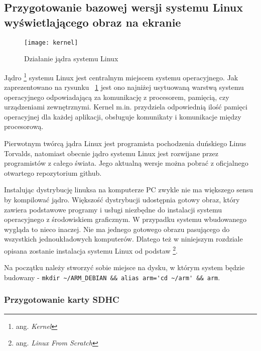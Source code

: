 \subsection{Przygotowanie bazowej wersji systemu Linux wyświetlającego obraz na ekranie}

\begin{figure}
\begin{center}
    \texttt{[image: kernel]}
\end{center}
\caption{Działanie jądra systemu Linux}
\label{fig:kernel}
\end{figure}

Jądro \footnote{ang. \emph{Kernel}} systemu Linux jest centralnym miejscem systemu operacyjnego. Jak zaprezentowano na rysunku ~\ref{fig:kernel} jest ono najniżej usytuowaną warstwą systemu operacyjnego odpowiadającą za komunikację z procesorem, pamięcią, czy urządzeniami zewnętrznymi. Kernel m.in. przydziela odpowiednią ilość pamięci operacyjnej dla każdej aplikacji, obsługuje komunikaty i komunikacje między procesorową.

Pierwotnym twórcą jądra Linux jest programista pochodzenia duńskiego Linus Torvalds, natomiast obecnie jądro systemu Linux jest rozwijane przez programistów z całego świata. Jego aktualną wersje można pobrać z oficjalnego otwartego repozytorium github.


\par


Instalując dystrybucję linuksa na komputerze PC zwykle nie ma większego sensu by kompilować jądro. Większość dystrybucji udostępnia gotowy obraz, który zawiera podstawowe programy i usługi niezbędne do instalacji systemu operacyjnego z środowiskiem graficznym. W przypadku systemu wbudowanego wygląda to nieco inaczej. Nie ma jednego gotowego obrazu pasującego do wszystkich jednoukładowych komputerów. Dlatego też w niniejszym rozdziale opisana zostanie instalacja systemu Linux od podstaw \footnote{ang. \emph{Linux From Scratch}}.

\par


Na początku należy stworzyć sobie miejsce na dysku, w którym system będzie budowany - \lstinline{mkdir ~/ARM_DEBIAN && alias arm='cd ~/arm' && arm}.

\subsubsection{Przygotowanie karty SDHC}


